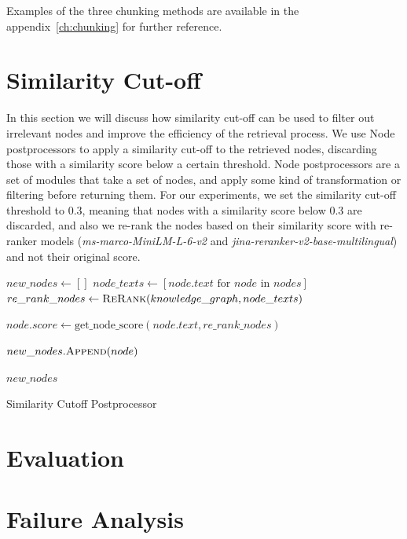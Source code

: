Examples of the three chunking methods are available in the appendix~\ref{ch:chunking} for further reference.

\section{Similarity Cut-off}\label{sec:similar-cut-off}
In this section we will discuss how similarity cut-off can be used to filter out irrelevant nodes and improve the efficiency of the retrieval process.
We use Node postprocessors to apply a similarity cut-off to the retrieved nodes, discarding those with a similarity score below a certain threshold.
Node postprocessors are a set of modules that take a set of nodes, and apply some kind of transformation or filtering before returning them.
For our experiments, we set the similarity cut-off threshold to 0.3, meaning that nodes with a similarity score below 0.3 are discarded, and also we re-rank the nodes based on their similarity score with re-ranker models (\textit{ms-marco-MiniLM-L-6-v2} and \textit{jina-reranker-v2-base-multilingual}) and not their original score.

\begin{algorithm}
    \begin{algorithmic}[1]
            \State $new\_nodes \gets []$
            \State $node\_texts \gets [node.text \text{ for } node \text{ in } nodes]$
            \State $re\_rank\_nodes \gets \textsc{ReRank}(knowledge\_graph, node\_texts)$

                \State $node.score \gets \text{get\_node\_score}(node.text, re\_rank\_nodes)$

                    \State $new\_nodes.\textsc{Append}(node)$
                \EndIf
            \EndFor

            \State \Return $new\_nodes$
        \EndProcedure
    \end{algorithmic}
    \caption{Similarity Cutoff Postprocessor}\label{alg:algorithm}
\end{algorithm}

\section{Evaluation}\label{sec:evaluation-and-discussion}


\section{Failure Analysis}\label{sec:faiure-analysis}